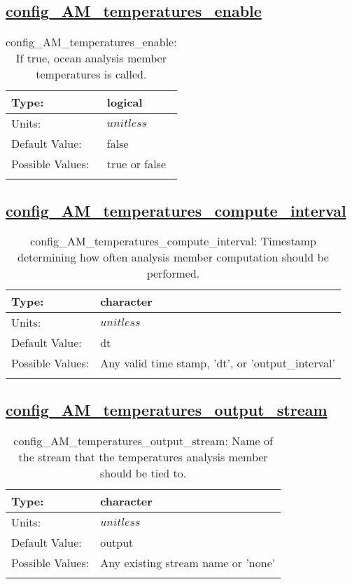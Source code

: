 \subsection[config\_AM\_temperatures\_enable]{\hyperref[sec:nm_tab_AM_temperatures]{config\_AM\_temperatures\_enable}}
\label{subsec:nm_sec_config_AM_temperatures_enable}
\begin{center}
\begin{longtable}{| p{2.0in} || p{4.0in} |}
    \hline
    Type: & logical \\
    \hline
    Units: & $unitless$ \\
    \hline
    Default Value: & false \\
    \hline
    Possible Values: & true or false \\
    \hline
    \caption{config\_AM\_temperatures\_enable: If true, ocean analysis member temperatures is called.}
\end{longtable}
\end{center}
\subsection[config\_AM\_temperatures\_compute\_interval]{\hyperref[sec:nm_tab_AM_temperatures]{config\_AM\_temperatures\_compute\_interval}}
\label{subsec:nm_sec_config_AM_temperatures_compute_interval}
\begin{center}
\begin{longtable}{| p{2.0in} || p{4.0in} |}
    \hline
    Type: & character \\
    \hline
    Units: & $unitless$ \\
    \hline
    Default Value: & dt \\
    \hline
    Possible Values: & Any valid time stamp, 'dt', or 'output\_interval' \\
    \hline
    \caption{config\_AM\_temperatures\_compute\_interval: Timestamp determining how often analysis member computation should be performed.}
\end{longtable}
\end{center}
\subsection[config\_AM\_temperatures\_output\_stream]{\hyperref[sec:nm_tab_AM_temperatures]{config\_AM\_temperatures\_output\_stream}}
\label{subsec:nm_sec_config_AM_temperatures_output_stream}
\begin{center}
\begin{longtable}{| p{2.0in} || p{4.0in} |}
    \hline
    Type: & character \\
    \hline
    Units: & $unitless$ \\
    \hline
    Default Value: & output \\
    \hline
    Possible Values: & Any existing stream name or 'none' \\
    \hline
    \caption{config\_AM\_temperatures\_output\_stream: Name of the stream that the temperatures analysis member should be tied to.}
\end{longtable}
\end{center}
